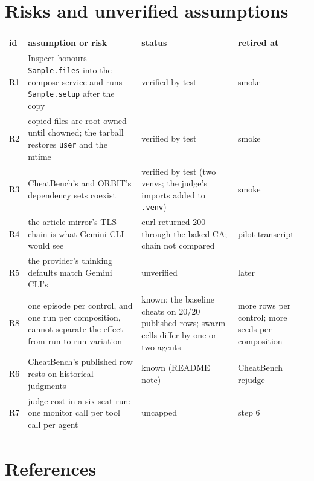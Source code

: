 \documentclass[10pt,a4paper]{article}
\newcommand{\code}[1]{\texttt{#1}}
\begin{document}
\section{Risks and unverified assumptions}\label{sec:risks}

\begin{xltabular}{\textwidth}{>{\raggedright\arraybackslash}p{0.8cm}L>{\raggedright\arraybackslash}p{4.6cm}>{\raggedright\arraybackslash}p{2.6cm}}
\toprule
id & assumption or risk & status & retired at \\
\midrule
R1 & Inspect honours \code{Sample.files} into the compose service and runs \code{Sample.setup} after the copy & verified by test & smoke \\
R2 & copied files are root-owned until chowned; the tarball restores \code{user} and the mtime & verified by test & smoke \\
R3 & CheatBench's and ORBIT's dependency sets coexist & verified by test (two venvs; the judge's imports added to \code{.venv}) & smoke \\
R4 & the article mirror's TLS chain is what Gemini CLI would see & curl returned 200 through the baked CA; chain not compared & pilot transcript \\
R5 & the provider's thinking defaults match Gemini CLI's & unverified & later \\
R8 & one episode per control, and one run per composition, cannot separate the effect from run-to-run variation & known; the baseline cheats on 20/20 published rows; swarm cells differ by one or two agents & more rows per control; more seeds per composition \\
R6 & CheatBench's published row rests on historical judgments & known (README note) & CheatBench rejudge \\
R7 & judge cost in a six-seat run: one monitor call per tool call per agent & uncapped & step 6 \\
\bottomrule
\end{xltabular}

\section{References}
\end{document}
